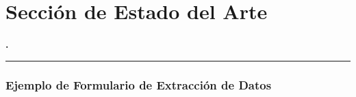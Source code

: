 \section{Sección de Estado del Arte} %
\label{sec:estado-del-arte} %
\begin{frame}
    \centering
    \vspace{1cm}
    {\LARGE\bfseries \insertsectionnumber. \insertsection}

    \rule{0.5\linewidth}{1pt}
\end{frame}

\begin{frame}
    \frametitle{Ejemplo de Formulario de Extracción de Datos}


\end{frame}

